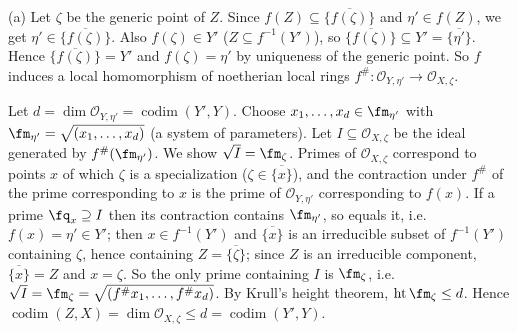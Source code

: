\documentclass[11pt]{article}
\begin{document}
(a) Let $\zeta$ be the generic point of $Z$. Since $f(Z)\subseteq\overline{\{f(\zeta)\}}$ and $\eta'\in f(Z)$, we get $\eta'\in\overline{\{f(\zeta)\}}$. Also $f(\zeta)\in Y'$ ($Z\subseteq f^{-1}(Y')$), so $\overline{\{f(\zeta)\}}\subseteq Y'=\overline{\{\eta'\}}$. Hence $\overline{\{f(\zeta)\}}=Y'$ and $f(\zeta)=\eta'$ by uniqueness of the generic point. So $f$ induces a local homomorphism of noetherian local rings $f^\#:\mathcal O_{Y,\eta'}\to\mathcal O_{X,\zeta}$.

Let $d=\dim\mathcal O_{Y,\eta'}=\operatorname{codim}(Y',Y)$. Choose $x_1,\dots,x_d\in\fm_{\eta'}$ with $\fm_{\eta'}=\sqrt{(x_1,\dots,x_d)}$ (a system of parameters). Let $I\subseteq\mathcal O_{X,\zeta}$ be the ideal generated by $f^\#(\fm_{\eta'})$. We show $\sqrt I=\fm_\zeta$. Primes of $\mathcal O_{X,\zeta}$ correspond to points $x$ of which $\zeta$ is a specialization ($\zeta\in\overline{\{x\}}$), and the contraction under $f^\#$ of the prime corresponding to $x$ is the prime of $\mathcal O_{Y,\eta'}$ corresponding to $f(x)$. If a prime $\fq_x\supseteq I$ then its contraction contains $\fm_{\eta'}$, so equals it, i.e.\ $f(x)=\eta'\in Y'$; then $x\in f^{-1}(Y')$ and $\overline{\{x\}}$ is an irreducible subset of $f^{-1}(Y')$ containing $\zeta$, hence containing $Z=\overline{\{\zeta\}}$; since $Z$ is an irreducible component, $\overline{\{x\}}=Z$ and $x=\zeta$. So the only prime containing $I$ is $\fm_\zeta$, i.e.\ $\sqrt I=\fm_\zeta=\sqrt{(f^\#x_1,\dots,f^\#x_d)}$. By Krull's height theorem, $\operatorname{ht}\fm_\zeta\le d$. Hence $\operatorname{codim}(Z,X)=\dim\mathcal O_{X,\zeta}\le d=\operatorname{codim}(Y',Y)$.
\end{document}
